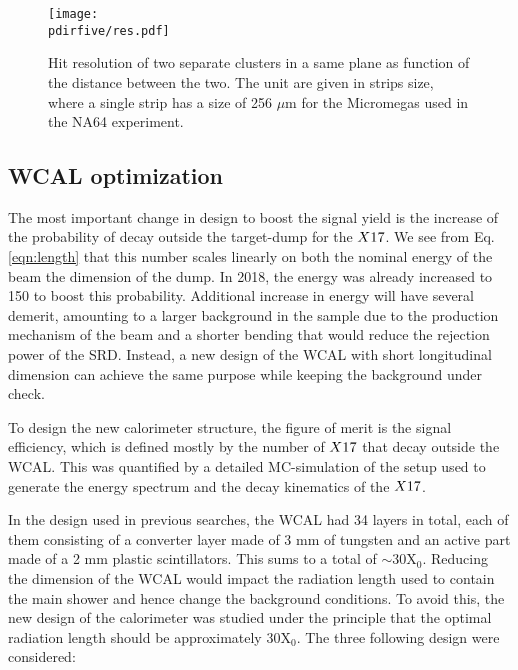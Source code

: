 \begin{figure}[tbh!]
  \centering
  \texttt{[image: \\pdirfive/res.pdf]}
  \caption[Hit resolution as function of the two cluster distance]{Hit resolution of two separate clusters in a same plane as function of the distance between the two. The unit are given in strips size, where a single strip has a size of 256 $\mu$m for the Micromegas used in the NA64 experiment.}
  \label{fig:res-hit}
\end{figure}

\subsection{WCAL optimization}
\label{ch5:sec:new-vismode-setup-wcal}

The most important change in design to boost the signal yield is the increase of the probability of decay outside the target-dump for the $X17$. We see from Eq.\ref{eqn:length} that this number scales linearly on both the nominal energy of the beam the dimension of the dump. In 2018, the energy was already increased to 150 \gev to boost this probability. Additional increase in energy will have several demerit, amounting to a larger background in the sample due to the production mechanism of the beam and a shorter bending that would reduce the rejection power of the SRD. Instead, a new design of the WCAL with short longitudinal dimension can achieve the same purpose while keeping the background under check.

To design the new calorimeter structure, the figure of merit is the signal efficiency, which is defined mostly by the number of $X17$ that decay outside the WCAL. This was quantified by a detailed MC-simulation of the setup used to generate the energy spectrum and the decay kinematics of the $X17$.

In the design used in previous searches, the WCAL had 34 layers in total, each of them consisting of a converter layer made of 3 mm of tungsten and an active part made of a 2 mm plastic scintillators. This sums to a total of $\sim$30X$_0$. Reducing the dimension of the WCAL would impact the radiation length used to contain the main shower and hence change the background conditions. To avoid this, the new design of the calorimeter was studied under the principle that the optimal radiation length should be approximately 30X$_0$. The three following design were considered:


